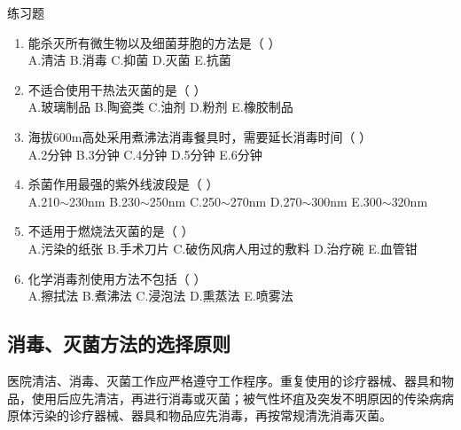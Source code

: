 \documentclass[11pt, a4paper]{ctexart}
\begin{document}
\begin{examplebox}{练习题}
	\begin{enumerate}
		\item 能杀灭所有微生物以及细菌芽胞的方法是（ ）\\
		      A.清洁 \quad B.消毒 \quad C.抑菌 \quad D.灭菌 \quad E.抗菌
		\item 不适合使用干热法灭菌的是（ ）\\
		      A.玻璃制品 \quad B.陶瓷类 \quad C.油剂 \quad D.粉剂 \quad E.橡胶制品
		\item 海拔600m高处采用煮沸法消毒餐具时，需要延长消毒时间（ ）\\
		      A.2分钟 \quad B.3分钟 \quad C.4分钟 \quad D.5分钟 \quad E.6分钟
		\item 杀菌作用最强的紫外线波段是（ ）\\
		      A.210$\sim$230nm \quad B.230$\sim$250nm \quad C.250$\sim$270nm \quad D.270$\sim$300nm \quad E.300$\sim$320nm
		\item 不适用于燃烧法灭菌的是（ ）\\
		      A.污染的纸张 \quad B.手术刀片 \quad C.破伤风病人用过的敷料 \quad D.治疗碗 \quad E.血管钳
		\item 化学消毒剂使用方法不包括（ ）\\
		      A.擦拭法 \quad B.煮沸法 \quad C.浸泡法 \quad D.熏蒸法 \quad E.喷雾法
	\end{enumerate}
\end{examplebox}

\subsection{消毒、灭菌方法的选择原则}
医院清洁、消毒、灭菌工作应严格遵守工作程序。重复使用的诊疗器械、器具和物品，使用后应先清洁，再进行消毒或灭菌；被气性坏疽及突发不明原因的传染病病原体污染的诊疗器械、器具和物品应先消毒，再按常规清洗消毒灭菌。
\end{document}

